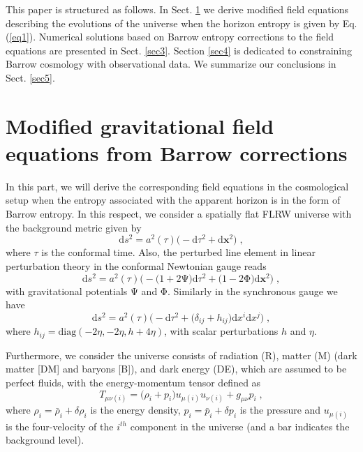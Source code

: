 \documentclass[11pt,twocolumn]{article}
\begin{document}
This paper is structured as follows. In Sect. \ref{sec2} we
derive modified field equations describing the evolutions of the
universe when the horizon entropy is given by Eq. (\ref{eq1}).
Numerical solutions based on Barrow entropy corrections to the
field equations are presented in Sect. \ref{sec3}. Section
\ref{sec4} is dedicated to constraining Barrow cosmology with
observational data. We summarize our conclusions in Sect.
\ref{sec5}.
\section{Modified gravitational field equations from Barrow corrections} \label{sec2}
In this part, we will derive the corresponding field
equations in the cosmological setup when the entropy associated
with the apparent horizon is in the form of Barrow entropy. In
this respect, we consider a spatially flat FLRW universe with the
background metric given by
\begin{equation} \label{eq2}
\mathrm{d}s^2=a^2(\tau)\big(-\mathrm{d}\tau^2+\mathrm{d}\pmb{x}^2\big)
\;,
\end{equation}
where $\tau$ is the conformal time. Also, the perturbed line
element in linear perturbation theory in the conformal Newtonian gauge
reads
\begin{equation} \label{eq3}
\mathrm{d}s^2=a^2(\tau)\Big(-\big(1+2\mathrm{\Psi}\big)\mathrm{d}\tau^2+\big(1-2\mathrm{\Phi}\big)\mathrm{d}\pmb{x}^2\Big)
\;,
\end{equation}
with gravitational potentials $\mathrm{\Psi}$ and $\mathrm{\Phi}$. Similarly in
the synchronous gauge we have
\begin{equation} \label{eq4}
\mathrm{d}s^2=a^2(\tau)\Big(-\mathrm{d}\tau^2+\big(\delta_{ij}+h_{ij}\big)\mathrm{d}x^i\mathrm{d}x^j\Big)
\;,
\end{equation}
where $h_{ij}=\mathrm{diag}(-2\eta,-2\eta,h+4\eta)$, with scalar
perturbations $h$ and $\eta$.

Furthermore, we consider the universe consists of radiation (R),
matter (M) (dark matter [DM] and baryons [B]), and dark energy
(DE), which are assumed to be perfect fluids, with the
energy-momentum tensor defined as
\begin{equation} \label{eq5}
T_{\mu \nu(i)}=\big(\rho_i+p_i\big)u_{\mu(i)}u_{\nu(i)}+g_{\mu \nu}p_i \;,
\end{equation}
where $\rho_i=\bar{\rho}_i+\delta\rho_i$ is the energy
density, $p_i=\bar{p}_i+\delta p_i$ is the pressure and
$u_{\mu(i)}$ is the four-velocity of the $i^{th}$ component in the
universe (and a bar indicates the background level).
\end{document}
